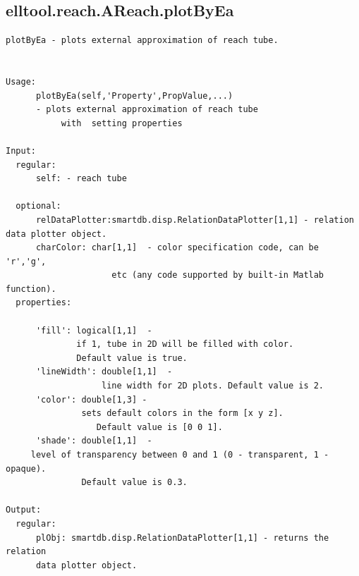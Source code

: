 \subsection{\texorpdfstring{elltool.reach.AReach.plotByEa}{plotByEa}}\label{method:elltool.reach.AReach.plotByEa}
\begin{verbatim}
plotByEa - plots external approximation of reach tube.


Usage:
      plotByEa(self,'Property',PropValue,...)
      - plots external approximation of reach tube
           with  setting properties

Input:
  regular:
      self: - reach tube

  optional:
      relDataPlotter:smartdb.disp.RelationDataPlotter[1,1] - relation data plotter object.
      charColor: char[1,1]  - color specification code, can be 'r','g',
                     etc (any code supported by built-in Matlab function).
  properties:

      'fill': logical[1,1]  -
              if 1, tube in 2D will be filled with color.
              Default value is true.
      'lineWidth': double[1,1]  -
                   line width for 2D plots. Default value is 2.
      'color': double[1,3] -
               sets default colors in the form [x y z].
                  Default value is [0 0 1].
      'shade': double[1,1]  -
     level of transparency between 0 and 1 (0 - transparent, 1 - opaque).
               Default value is 0.3.

Output:
  regular:
      plObj: smartdb.disp.RelationDataPlotter[1,1] - returns the relation
      data plotter object.
\end{verbatim}
